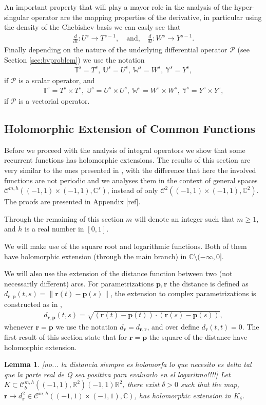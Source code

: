 \documentclass{article}
\newtheorem{lemma}[theorem]{Lemma}
\newcommand{\todo}[1]{{\color{red}[#1]}}
\newcommand{\IC}{{\mathbb C}}
\newcommand{\IR}{{\mathbb R}}
\newcommand{\IU}{{\mathbb U}}
\newcommand{\IT}{{\mathbb T}}
\newcommand{\IW}{{\mathbb W}}
\newcommand{\IY}{{\mathbb Y}}
\newcommand{\bp}{{\bm p}}
\newcommand{\cmspace}[3]{\mathcal{C}^{#1} \left( #2, #3 \right)}
\newcommand{\cmspaceh}[4]{\mathcal{C}^{#1,#2} \left( #3, #4 \right)}
\newcommand{\rgeoh}[2]{\mathcal{C}_b^{#1,#2}\left( (-1,1), \IR^2 \right)}
\newcommand{\cP}{\mathcal{P}}
\newcommand{\br}{\bm{r}}
\newcommand{\iinterv}{(-1,1)\times(-1,1)}
\begin{document}
An important property that will play a mayor role in the analysis of the hyper-singular operator are the mapping properties of the derivative, in particular using the density of the Chebishev basis we can easly see that 
\begin{align}
\label{eq:devprop}
\frac{d}{dt} : U^s \rightarrow T^{s-1}, \quad \text{and,} \quad 
\frac{d}{dt} : W^s \rightarrow Y^{s-1}.
\end{align}
Finally depending on the nature of the underlying differential operator $\cP$ (see Section \ref{sec:bvproblem}) we use the notation 
\begin{align*}
\IT^s = T^s,\ \IU^s = U^s, \ \IW^s = W^s, \ \IY^s = Y^s,
\end{align*}
if $\cP$ is a scalar operator, and 
\begin{align*}
\IT^s = T^s \times T^s,\ \IU^s = U^s \times U^s, \ \IW^s = W^s \times W^s, \ \IY^s = Y^s \times Y^s,
\end{align*}
if $\cP$ is a vectorial operator.
\subsection{Holomorphic Extension of Common Functions}
\label{sec:funext}
Before we proceed with the analysis of integral operators we show that some recurrent functions has holomorphic extensions. The results of this section are very similar to the ones presented  in \cite{Henriquez2021}, with the difference that here the involved functions are not periodic and we analyses them in the context of general spaces $\cmspaceh{m}{h}{\iinterv}{\IC^s}$, instead of only $\cmspace{2}{\iinterv}{\IC^2}$. The proofs are presented in Appendix \todo{ref}.

Through the remaining of this section $m$ will denote an integer such that $m\geq 1$, and $h$ is a real number in $[0,1]$.

We will make use of the square root and logarithmic functions. Both of them have holomorphic extension (through the main branch) in $\IC \setminus (-\infty,0]$.

We will also use the extension of the distance function between two (not necessarily different) arcs. For parametrizations $\bp,\br$ the distance is defined as $d_{\br,\bp}(t,s) = \| \br(t)-\bp(s)\|$, the extension to complex parametrizations is constructed as in \cite{Henriquez2021}, 
\begin{align*}
d_{\br,\bp}(t,s) = \sqrt{(\br(t)-\bp(t))\cdot(\br(s)-\bp(s))},
\end{align*}
whenever $\br = \bp$ we use the notation $d_{\br} = d_{\br,\br}$, and over define $d_{\br}(t,t)=0$. The first result of this section state that for $\br = \bp$ the square of the distance have holomorphic extension.
\begin{lemma} \todo{no... la distancia siempre es holomorfa lo que necesito es delta tal que la parte real de Q sea positiva para evaluarlo en el logaritmo!!!!}
Let $K \subset \rgeoh{m}{h}{(-1,1)}{\IR^2}$, there exist $\delta>0$ such that the map, $\br \mapsto d_{\br}^2 \in \cmspaceh{m}{h}{\iinterv}{\IC}$, has holomorphic extension in $K_\delta$.
\end{lemma}
\end{document}
